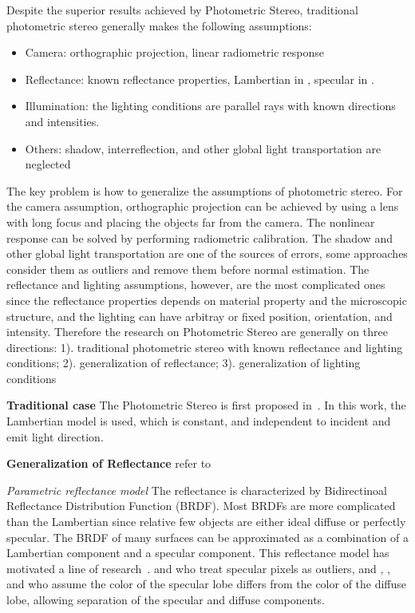 Despite the superior results achieved by Photometric Stereo,  traditional photometric stereo generally makes the following assumptions:
\begin{itemize}
\item Camera: orthographic projection, linear radiometric response
\item Reflectance: known reflectance properties, \eg Lambertian in \cite{woodham1980photometric}, specular in \cite{}.
\item Illumination: the lighting conditions are parallel rays with known directions and intensities.
\item Others: shadow, interreflection, and other global light transportation are neglected
\end{itemize}

The key problem is how to generalize the assumptions of photometric stereo. For the camera assumption, orthographic projection can be achieved by using a lens with long focus and placing the objects far from the camera. The nonlinear response can be solved by performing radiometric calibration. The shadow and other global light transportation are one of the sources of errors, some approaches consider them as outliers and remove them before normal estimation. The reflectance and lighting assumptions, however, are the most complicated ones since the reflectance properties depends on material property and the microscopic structure, and the lighting can have arbitray or fixed position, orientation, and intensity. Therefore the research on Photometric Stereo are generally on three directions: 1). traditional photometric stereo with known reflectance and lighting conditions; 2). generalization of reflectance; 3). generalization of lighting conditions

\textbf{Traditional case} The Photometric Stereo is first proposed in~\cite{woodham1980photometric}. In this work, the Lambertian model is used, which is constant, and independent to incident and emit light direction.

\textbf{Generalization of Reflectance}
refer to \cite{alldrin2008photometric}

\textit{Parametric reflectance model} The reflectance is characterized by Bidirectinoal Reflectance Distribution Function (BRDF). Most BRDFs are more complicated than the Lambertian since relative few objects are either ideal diffuse or perfectly specular. The BRDF of many surfaces can be approximated as a combination of a Lambertian component and a specular component. This reflectance model has motiva{}ted a line of research~\cite{barsky20034,coleman1982obtaining,nayar1990determining}. \citeauthor{coleman1982obtaining} and \citeauthor{barsky20034} who treat specular pixels as outliers, and \citeauthor{schluns1993photometric}, \citeauthor{sato1994temporal}, and \citeauthor{mallick2005beyond} who assume the color of the specular lobe differs from the color of the diffuse lobe, allowing separation of the specular and diffuse components.

